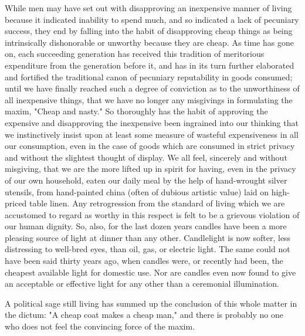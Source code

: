 \documentclass[12pt]{report}
\begin{document}
While men may have set out with disapproving an inexpensive manner of
living because it indicated inability to spend much, and so indicated
a lack of pecuniary success, they end by falling into the habit of
disapproving cheap things as being intrinsically dishonorable or
unworthy because they are cheap. As time has gone on, each succeeding
generation has received this tradition of meritorious expenditure from
the generation before it, and has in its turn further elaborated and
fortified the traditional canon of pecuniary reputability in goods
consumed; until we have finally reached such a degree of conviction as
to the unworthiness of all inexpensive things, that we have no
longer any misgivings in formulating the maxim, "Cheap and nasty." So
thoroughly has the habit of approving the expensive and disapproving
the inexpensive been ingrained into our thinking that we instinctively
insist upon at least some measure of wasteful expensiveness in all our
consumption, even in the case of goods which are consumed in strict
privacy and without the slightest thought of display. We all feel,
sincerely and without misgiving, that we are the more lifted up in
spirit for having, even in the privacy of our own household, eaten
our daily meal by the help of hand-wrought silver utensils, from
hand-painted china (often of dubious artistic value) laid on high-priced
table linen. Any retrogression from the standard of living which we are
accustomed to regard as worthy in this respect is felt to be a grievous
violation of our human dignity. So, also, for the last dozen years
candles have been a more pleasing source of light at dinner than any
other. Candlelight is now softer, less distressing to well-bred eyes,
than oil, gas, or electric light. The same could not have been said
thirty years ago, when candles were, or recently had been, the cheapest
available light for domestic use. Nor are candles even now found to
give an acceptable or effective light for any other than a ceremonial
illumination.

A political sage still living has summed up the conclusion of this whole
matter in the dictum: "A cheap coat makes a cheap man," and there is
probably no one who does not feel the convincing force of the maxim.
\end{document}
